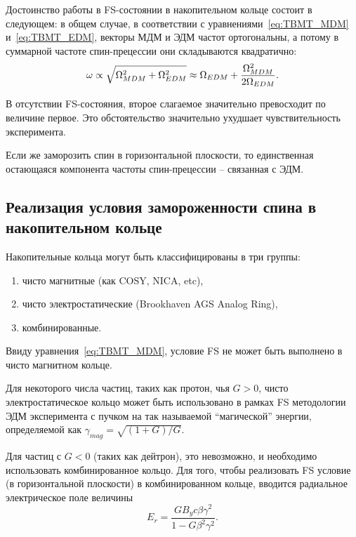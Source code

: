 Достоинство работы в FS-состоянии в накопительном кольце состоит в
следующем: в общем случае, в соответствии с уравнениями~\eqref{eq:TBMT_MDM} и~\eqref{eq:TBMT_EDM}, 
векторы МДМ и ЭДМ частот ортогональны, а потому в суммарной частоте
спин-прецессии они складываются квадратично:
\[
\omega \propto \sqrt{\Omega_{MDM}^2 + \Omega_{EDM}^2} \approx \Omega_{EDM} + \frac{\Omega_{MDM}^2}{2\Omega_{EDM}}.
\]

В отсутствии FS-состояния, второе слагаемое значительно превосходит по величине первое.
Это обстоятельство значительно ухудшает чувствительность эксперимента.

Если же заморозить спин в горизонтальной плоскости, то единственная
остающаяся компонента частоты спин-прецессии -- связанная с ЭДМ.

\subsection{Реализация условия замороженности спина в накопительном кольце}\label{sec:FS_in_a_ring}
Накопительные кольца могут быть классифицированы в три группы:
\begin{enumerate}
	\item чисто магнитные (как COSY, NICA, etc),
	\item чисто электростатические (Brookhaven AGS Analog Ring),
	\item комбинированные.
\end{enumerate}

Ввиду уравнения~\eqref{eq:TBMT_MDM}, условие FS не может быть
выполнено в чисто магнитном кольце.

Для некоторого числа частиц, таких как протон, чья $G>0$, чисто
электростатическое кольцо может быть использовано в рамках FS
методологии ЭДМ эксперимента с пучком на так называемой ``магической''
энергии, определяемой как $\gamma_{mag} = \sqrt{(1+G)/G}$.

Для частиц с $G<0$ (таких как дейтрон), это невозможно, и необходимо
использовать комбинированное кольцо. Для того, чтобы реализовать FS
условие (в горизонтальной плоскости) в комбинированном кольце, 
вводится радиальное электрическое поле величины~\cite[стр.~10]{BNL:Deuteron2008}
\begin{equation}\label{eq:FS_Er}
E_r = \frac{GB_yc\beta\gamma^2}{1-G\beta^2\gamma^2}.
\end{equation}
